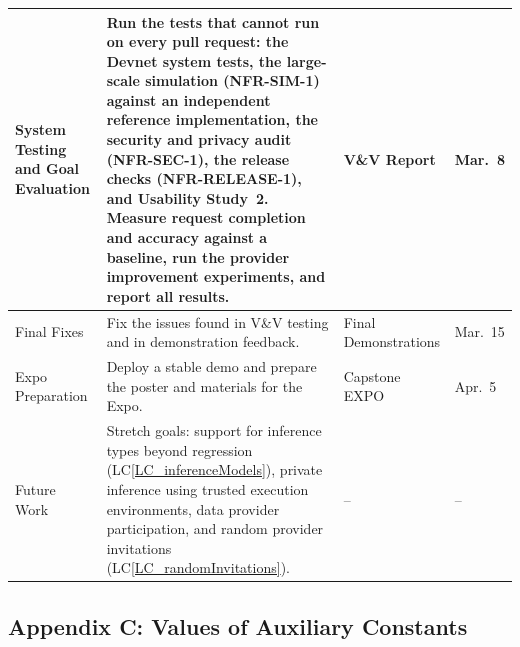 \documentclass[12pt]{article}
\begin{document}
\begin{longtable}{|p{}|p{}|p{}|p{}|}
System Testing and Goal Evaluation & Run the tests that cannot run on every pull request: the Devnet system tests, the large-scale simulation (NFR-SIM-1) against an independent reference implementation, the security and privacy audit (NFR-SEC-1), the release checks (NFR-RELEASE-1), and Usability Study~2. Measure request completion and accuracy against a baseline, run the provider improvement experiments, and report all results. & V\&V Report & Mar.~8 \\
\hline
Final Fixes & Fix the issues found in V\&V testing and in demonstration feedback. & Final Demonstrations & Mar.~15 \\
\hline
Expo Preparation & Deploy a stable demo and prepare the poster and materials for the Expo. & Capstone EXPO & Apr.~5 \\
\hline
Future Work & Stretch goals: support for inference types beyond regression (LC\ref{LC_inferenceModels}), private inference using trusted execution environments, data provider participation, and random provider invitations (LC\ref{LC_randomInvitations}). & -- & -- \\
\hline
\end{longtable}


\subsection{Appendix C: Values of Auxiliary Constants}



\end{document}
